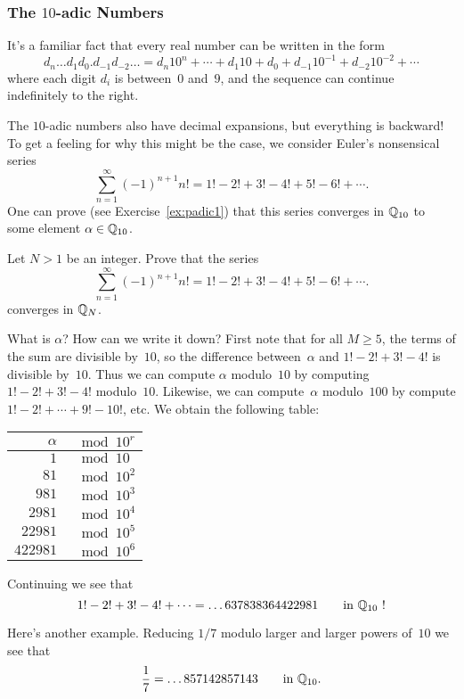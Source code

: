 \subsubsection{The $10$-adic Numbers}
\label{sec:tenadic}
It's a familiar fact that every real number can be written in the
form 
$$
d_n\ldots d_1 d_0.d_{-1}d_{-2}\ldots
 = d_n 10^{n} + \cdots + d_1 10 + d_0 
   + d_{-1} 10^{-1} + d_{-2} 10^{-2} + \cdots
$$
where each digit $d_i$ is between~$0$ and~$9$, and the sequence can
continue indefinitely to the right.  

The $10$-adic numbers also have decimal expansions, but everything is backward!
To get a feeling for why this might be the case, we consider Euler's
nonsensical series
$$
  \sum_{n=1}^{\infty} (-1)^{n+1}n! = 1! - 2! + 3! - 4! + 5! - 6! + \cdots.
$$
One can prove (see Exercise~\ref{ex:padic1}) that this series
converges in $\mathbb{Q}_{10}$ to some element $\alpha\in\mathbb{Q}_{10}$.

\begin{exercise}\label{ex:topology5}
Let $N>1$ be an integer.  Prove that the series
$$
  \sum_{n=1}^{\infty} (-1)^{n+1}n! = 1! - 2! + 3! - 4! + 5! - 6! + \cdots.
$$
converges in $\mathbb{Q}_N$.
\end{exercise}


What is $\alpha$?  How can we write it down?  First note that for all
$M\geq 5$, the terms of the sum are divisible by~$10$, so the difference
between~$\alpha$ and $1! - 2! + 3! - 4!$ is divisible by~$10$.  Thus
we can compute $\alpha$ modulo~$10$ by computing $1! - 2! + 3! - 4!$
modulo~$10$.  Likewise, we can compute~$\alpha$ modulo~$100$
by compute $1! - 2! + \cdots + 9! - 10!$, etc.  
We obtain the following table:
\begin{center}
\begin{tabular}{|rl|}\hline
$\alpha$ & $\mod 10^r$\\\hline
$1$ & $\mod 10$\\
$81$ & $\mod 10^2$\\
$981$ & $\mod 10^3$\\
$2981$ & $\mod 10^4$\\
$22981$ & $\mod 10^5$\\
$422981$ & $\mod 10^6$\\\hline
\end{tabular}
\end{center}
Continuing we see that
$$
 1! - 2! + 3! - 4! + \cdots = 
  \ldots 637838364422981\qquad\text{in $\mathbb{Q}_{10}$ !}
$$

Here's another example.  Reducing $1/7$ modulo larger and larger powers of~$10$ we
see that 
$$
 \frac{1}{7} = \ldots857142857143\qquad\text{in $\mathbb{Q}_{10}$}.
$$

